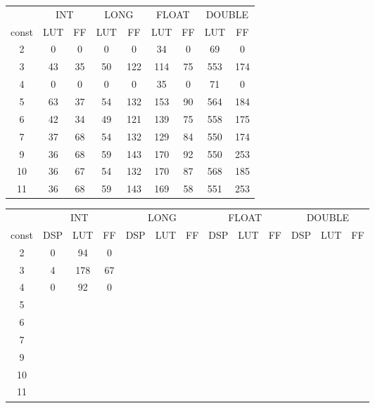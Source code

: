 \documentclass[10pt,a4paper,twoside]{article}
\author{Victor Lezaud}
\title{}
\begin{document}
\begin{tabular}{|c||c|c|c|c||c|c|c|c|}
    \hline
     & \multicolumn{2}{|c}{INT} & \multicolumn{2}{|c||}{LONG} & \multicolumn{2}{|c|}{FLOAT} &  \multicolumn{2}{|c|}{DOUBLE}\\
    const & LUT & FF & LUT & FF & LUT & FF & LUT & FF \\
    \hline
    2 & 0 & 0 & 0 & 0 & 34 & 0 & 69 & 0\\
    \hline
    3 & 43 & 35 & 50 & 122 & 114 & 75 & 553 & 174\\
    \hline
    4 & 0 & 0 & 0 & 0 & 35 & 0 & 71 & 0 \\
    \hline
    5 & 63 & 37 & 54 & 132 & 153 & 90 & 564 & 184\\
    \hline
    6 & 42 & 34 & 49 & 121 & 139 & 75 & 558 & 175\\
    \hline
    7 & 37 & 68 & 54 & 132 & 129 & 84 & 550 & 174\\
    \hline
    9 & 36 & 68 & 59 & 143 & 170 & 92 &  550 & 253 \\
    \hline
    10 & 36 & 67 & 54 & 132 & 170 & 87 & 568 & 185 \\
    \hline
    11 & 36 & 68 & 59 & 143 & 169 & 58 & 551 & 253 \\
    \hline
\end{tabular}

\begin{tabular}{|c||c|c|c|c|c|c||c|c|c|c|c|c|}
    \hline
     & \multicolumn{3}{|c}{INT} & \multicolumn{3}{|c||}{LONG} & \multicolumn{3}{|c|}{FLOAT} &  \multicolumn{3}{|c|}{DOUBLE}\\
    const & DSP & LUT & FF & DSP & LUT & FF & DSP & LUT & FF & DSP & LUT & FF \\
    \hline
    2 & 0 & 94 & 0 & &  &  &  &  & &  &  & \\
    \hline
    3 & 4 & 178 & 67 & &  &  &  &  & &  &  & \\
    \hline
    4 & 0 & 92 & 0 &  &  &  &  &  & &  &  & \\
    \hline
    5 &  &  &  &  &  &  &  &  & &  &  & \\
    \hline
    6 &  &  &  &  &  &  &  &  & &  &  & \\
    \hline
    7 &  &  &  &  &  &  &  &  & &  &  & \\
    \hline
    9 &  &  &  &  &  &  &  &  & &  &  & \\
    \hline
    10 &  &  &  &  &  &  &  &  & &  &  & \\
    \hline
    11 &  &  &  &  &  &  &  &  & &  &  & \\
    \hline
\end{tabular}
\end{document}
